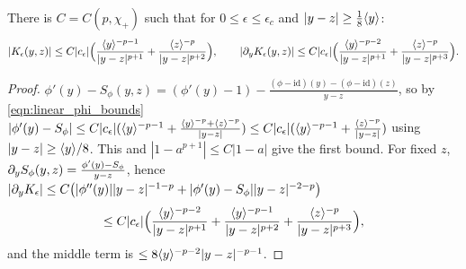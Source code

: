 \begin{lemma}
  \label{lem:c08_R2_kernel_far}
  There is $C=C(p,\chi_+)$ such that for $0\le\epsilon\le\epsilon_c$ and $|y-z|\ge\frac18\langle y \rangle$:
  \[
    |K_\epsilon(y,z)|\le C|c_\epsilon|\Bigl(\frac{\langle y \rangle^{-p-1}}{|y-z|^{p+1}}+\frac{\langle z \rangle^{-p}}{|y-z|^{p+2}}\Bigr),\qquad
    |\partial_yK_\epsilon(y,z)|\le C|c_\epsilon|\Bigl(\frac{\langle y \rangle^{-p-2}}{|y-z|^{p+1}}+\frac{\langle z \rangle^{-p}}{|y-z|^{p+3}}\Bigr).
  \]
\end{lemma}
\begin{proof}
  $\phi'(y)-S_\phi(y,z)=(\phi'(y)-1)-\frac{(\phi-\mathrm{id})(y)-(\phi-\mathrm{id})(z)}{y-z}$, so by \eqref{eqn:linear_phi_bounds}
  $|\phi'(y)-S_\phi|\le C|c_\epsilon|(\langle y \rangle^{-p-1}+\frac{\langle y \rangle^{-p}+\langle z \rangle^{-p}}{|y-z|})\le C|c_\epsilon|(\langle y \rangle^{-p-1}+\frac{\langle z \rangle^{-p}}{|y-z|})$
  using $|y-z|\ge\langle y \rangle/8$. This and $|1-a^{p+1}|\le C|1-a|$ give the first bound. For fixed $z$,
  $\partial_yS_\phi(y,z)=\frac{\phi'(y)-S_\phi}{y-z}$, hence
  $|\partial_yK_\epsilon|\le C\bigl(|\phi''(y)||y-z|^{-1-p}+|\phi'(y)-S_\phi||y-z|^{-2-p}\bigr)$
  \begin{equation}\label{eqn:linear_R2_far_kernel_derivative}
    \le C|c_\epsilon|\Bigl(\frac{\langle y \rangle^{-p-2}}{|y-z|^{p+1}}+\frac{\langle y \rangle^{-p-1}}{|y-z|^{p+2}}+\frac{\langle z \rangle^{-p}}{|y-z|^{p+3}}\Bigr),
  \end{equation}
  and the middle term is $\le8\langle y \rangle^{-p-2}|y-z|^{-p-1}$.
\end{proof}

